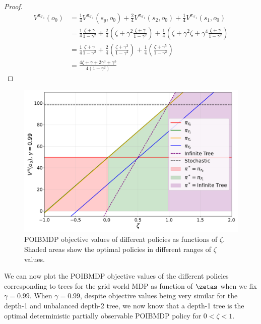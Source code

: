 \begin{proof}
\begin{align*}
    V^{\pi_{\mathcal{T}_1}} (o_0) &= \frac{1}{4} V^{\pi_{\mathcal{T}_1}} (s_g, o_0) + \frac{2}{4} V^{\pi_{\mathcal{T}_1}} (s_2, o_0) + \frac{1}{4} V^{\pi_{\mathcal{T}_1}} (s_1, o_0) \\
    &= \frac{1}{4} \frac{\zeta + \gamma}{1 - \gamma^2} + \frac{2}{4} (\zeta + \gamma^2 \frac{\zeta + \gamma}{1 - \gamma^2}) + \frac{1}{4} (\zeta + \gamma^2 \zeta + \gamma^4 \frac{\zeta + \gamma}{1 - \gamma^2}) \\
    &= \frac{1}{4} \frac{\zeta + \gamma}{1 - \gamma^2} + \frac{2}{4} (\frac{\zeta + \gamma ^ 3}{1-\gamma^2}) + \frac{1}{4}(\frac{\zeta+\gamma^5}{1-\gamma^2}) \\
    &= \frac{4\zeta + \gamma + 2\gamma^3 + \gamma^5}{4(1-\gamma^2)}
\end{align*}
\end{proof}


\begin{figure}
    \centering
    \includegraphics[width=1\textwidth]{images/images_part1/objective_values_plot.pdf}
    \caption{POIBMDP objective values of different policies as functions of $\zeta$. Shaded areas show the optimal policies in different ranges of $\zeta$ values.}\label{fig:objectives}
\end{figure}

We can now plot the POIBMDP objective values of the different policies corresponding to trees for the grid world MDP as function of $\zetas$ when we fix $\gamma=0.99$. 
When $\gamma=0.99$, despite objective values being very similar for the depth-1 and unbalanced depth-2 tree, we now know that {\color{blue}a depth-1 tree is the optimal deterministic partially observable POIBMDP policy for $0< \zeta < 1$}.

